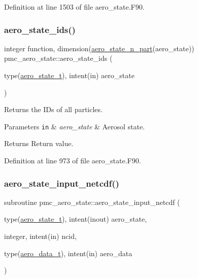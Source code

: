 Definition at line 1503 of file aero\+\_\+state.\+F90.

\mbox{\label{namespacepmc__aero__state_a4c0671e83504e6bd71735b876c78ec2f}} 
\subsubsection{\texorpdfstring{aero\+\_\+state\+\_\+ids()}{aero\_state\_ids()}}
{\footnotesize\ttfamily integer function, dimension(\mbox{\hyperlink{namespacepmc__aero__state_a94155bf7fa94e7c3ab722a5a1dacac98}{aero\+\_\+state\+\_\+n\+\_\+part}}(aero\+\_\+state)) pmc\+\_\+aero\+\_\+state\+::aero\+\_\+state\+\_\+ids (\begin{DoxyParamCaption}\item[{type(\mbox{\hyperlink{structpmc__aero__state_1_1aero__state__t}{aero\+\_\+state\+\_\+t}}), intent(in)}]{aero\+\_\+state }\end{DoxyParamCaption})}



Returns the I\+Ds of all particles. 


\begin{DoxyParams}[1]{Parameters}
\mbox{\tt in}  & {\em aero\+\_\+state} & Aerosol state.\\
\hline
\end{DoxyParams}
\begin{DoxyReturn}{Returns}
Return value. 
\end{DoxyReturn}


Definition at line 973 of file aero\+\_\+state.\+F90.

\mbox{\label{namespacepmc__aero__state_a2118eb683c0dc350e8f48a59ea8ed8ce}} 
\subsubsection{\texorpdfstring{aero\+\_\+state\+\_\+input\+\_\+netcdf()}{aero\_state\_input\_netcdf()}}
{\footnotesize\ttfamily subroutine pmc\+\_\+aero\+\_\+state\+::aero\+\_\+state\+\_\+input\+\_\+netcdf (\begin{DoxyParamCaption}\item[{type(\mbox{\hyperlink{structpmc__aero__state_1_1aero__state__t}{aero\+\_\+state\+\_\+t}}), intent(inout)}]{aero\+\_\+state,  }\item[{integer, intent(in)}]{ncid,  }\item[{type(\mbox{\hyperlink{structpmc__aero__data_1_1aero__data__t}{aero\+\_\+data\+\_\+t}}), intent(in)}]{aero\+\_\+data }\end{DoxyParamCaption})}



